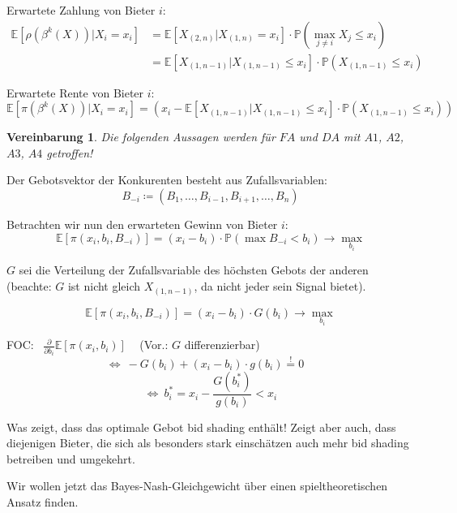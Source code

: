 \documentclass[12pt]{extreport} %
\theoremstyle{named}
\theoremstyle{itshape}
\theoremstyle{normal}
\newtheorem*{vereinbarung}{Vereinbarung}
\begin{document}
Erwartete Zahlung von Bieter $i$:
	\begin{align*}
		\mathbb{E}\left[ \rho\left( \beta^{k}(X) \right) \big| X_{i} = x_{i} \right] & = \mathbb{E}\left[ X_{(2,n)} \big| X_{(1, n)} = x_{i} \right] \cdot \mathbb{P}\left( \max_{j\neq i} X_{j} \leq x_{i} \right) \\
			& = \mathbb{E}\left[ X_{(1,n-1)} \big| X_{(1, n-1)} \leq x_{i} \right] \cdot \mathbb{P}\left( X_{(1, n-1)} \leq x_{i} \right)
	\end{align*}
	
Erwartete Rente von Bieter $i$:
$$ \mathbb{E}\left[ \pi\left( \beta^{k}(X) \right) \big| X_{i} = x_{i} \right] = \left( x_{i} - \mathbb{E} \left[ X_{(1, n-1)} \big| X_{(1, n-1)} \leq x_{i} \right] \cdot \mathbb{P}\left( X_{(1,n-1)} \leq x_{i} \right) \right) $$

\begin{vereinbarung}
	Die folgenden Aussagen werden für $FA$ und $DA$ mit $A1$, $A2$, $A3$, $A4$ getroffen!
\end{vereinbarung}

Der Gebotsvektor der Konkurenten besteht aus Zufallsvariablen:
	$$ B_{-i} \coloneqq \left(B_{1}, \dotsc, B_{i-1}, B_{i+1}, \dotsc, B_{n} \right) $$

Betrachten wir nun den erwarteten Gewinn von Bieter $i$:
$$ \mathbb{E}[\pi\left( x_{i}, b_{i}, B_{-i} \right)] = (x_{i} - b_{i}) \cdot \mathbb{P}\left( \max B_{-i} < b_{i} \right) \longrightarrow \max_{b_{i}} $$

$G$ sei die Verteilung der Zufallsvariable des höchsten Gebots der anderen (beachte: $G$ ist nicht gleich $X_{(1, n-1)}$, da nicht jeder sein Signal bietet).

$$ \mathbb{E}[\pi\left( x_{i}, b_{i}, B_{-i} \right)] = (x_{i} - b_{i}) \cdot G(b_{i}) \longrightarrow \max_{b_{i}} $$

FOC: ~$\frac{\partial}{\partial b_{i}} \mathbb{E}\left[ \pi(x_{i}, b_{i} ) \right]$ ~ (Vor.: $G$ differenzierbar)
$$ \iff ~ - G(b_{i}) + (x_{i} - b_{i}) \cdot g(b_{i}) \overset{!}{=} 0 \quad $$
$$ \iff ~ b_{i}^{*} = x_{i} - \frac{G(b_{i}^{*})}{g(b_{i})} < x_{i} $$

Was zeigt, dass das optimale Gebot bid shading enthält! Zeigt aber auch, dass diejenigen Bieter, die sich als besonders stark einschätzen auch mehr bid shading betreiben und umgekehrt.

Wir wollen jetzt das Bayes-Nash-Gleichgewicht über einen spieltheoretischen Ansatz finden.  \\
\end{document}
